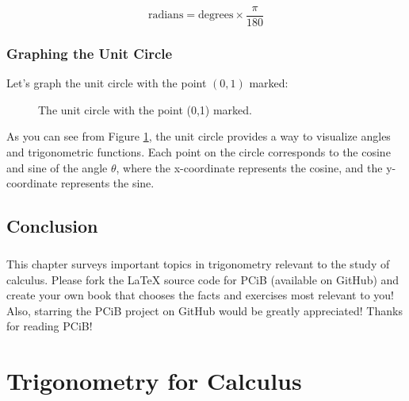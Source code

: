 \documentclass[a4paper,12pt]{book}
\begin{document}
\[
\text{radians} = \text{degrees} \times \frac{\pi}{180}
\]

\subsection{Graphing the Unit Circle}
\label{subsec:graphing_unit_circle}

Let's graph the unit circle with the point \((0,1)\) marked:

\begin{figure}[ht!]
\centering
{}
\caption{The unit circle with the point (0,1) marked.}
\label{fig:unit_circle}
\end{figure}

As you can see from Figure \ref{fig:unit_circle}, the unit circle provides a way to visualize angles and trigonometric functions. Each point on the circle corresponds to the cosine and sine of the angle \(\theta\), where the x-coordinate represents the cosine, and the y-coordinate represents the sine.



\section*{Conclusion}
\paragraph{}
This chapter surveys important topics in trigonometry relevant to the study of calculus. Please fork the LaTeX source code for PCiB (available on GitHub) and create your own book that chooses the facts and exercises most relevant to you! Also, starring the PCiB project on GitHub would be greatly appreciated! Thanks for reading PCiB!


\chapter{Trigonometry for Calculus}
\label{chap:trigonometry}
\end{document}
